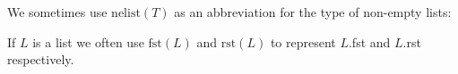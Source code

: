 




 
 

 
 

 

We sometimes use $\mathrm{nelist}(T)$ as an abbreviation for the type
of non-empty lists:
\begin{quote}
\end{quote}

If
$L$ is a list we often use $\mathrm{fst}(L)$ and $\mathrm{rst}(L)$ to
represent $L$.fst and $L$.rst respectively.

